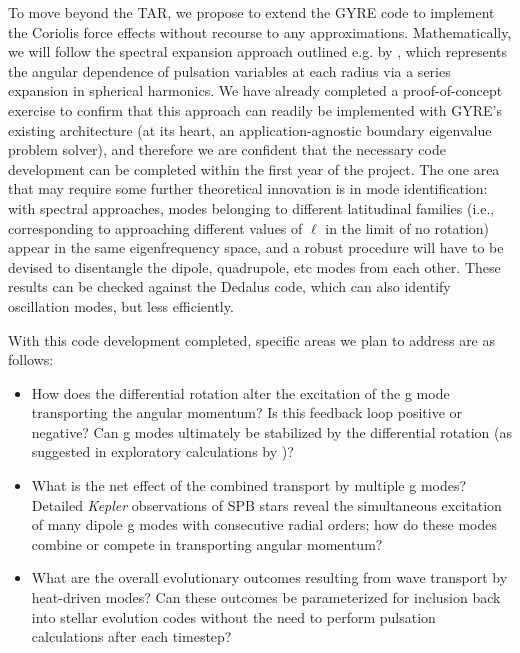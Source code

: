 To move beyond the TAR, we propose to extend the GYRE code to implement the Coriolis force effects without recourse to any approximations. Mathematically, we will follow the spectral expansion approach outlined e.g. by \citet{Lee:2001}, which represents the angular dependence of pulsation variables at each radius via a series expansion in spherical harmonics. We have already completed a proof-of-concept exercise to confirm that this approach can readily be implemented with GYRE's existing architecture (at its heart, an application-agnostic boundary eigenvalue problem solver), and therefore we are confident that the necessary code development can be completed within the first year of the project. The one area that may require some further theoretical innovation is in mode identification: with spectral approaches, modes belonging to different latitudinal families (i.e., corresponding to approaching different values of $\ell$ in the limit of no rotation) appear in the same eigenfrequency space, and a robust procedure will have to be devised to disentangle the dipole, quadrupole, etc modes from each other. These results can be checked against the Dedalus code, which can also identify oscillation modes, but less efficiently.

With this code development completed, specific areas we plan to address are as follows:
\begin{itemize}
\item How does the differential rotation alter the excitation of the g mode transporting the angular momentum? Is this feedback loop positive or negative? Can g modes ultimately be stabilized by the differential rotation (as suggested in exploratory calculations by \cite{Townsend:2008})?
\item What is the net effect of the combined transport by multiple g modes? Detailed \emph{Kepler} observations of SPB stars \citep[e.g., KIC 10526294][]{Papics:2014} reveal the simultaneous excitation of many dipole g modes with consecutive radial orders; how do these modes combine or compete in transporting angular momentum?
\item What are the overall evolutionary outcomes resulting from wave transport by heat-driven modes? Can these outcomes be parameterized for inclusion back into stellar evolution codes without the need to perform pulsation calculations after each timestep?
\end{itemize}
